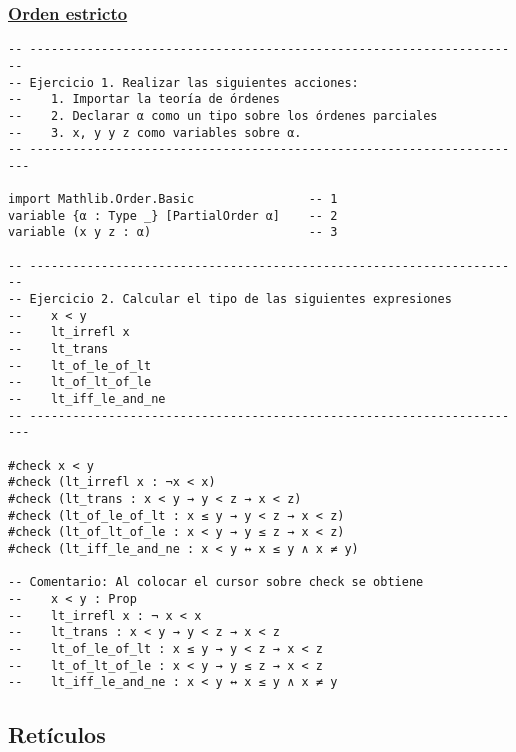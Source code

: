 \subsubsection{\href{./src/Basicos/Orden\_estricto.lean}{Orden estricto}}
\label{sec:orgc5952ca}
\begin{verbatim}
-- ---------------------------------------------------------------------
-- Ejercicio 1. Realizar las siguientes acciones:
--    1. Importar la teoría de órdenes
--    2. Declarar α como un tipo sobre los órdenes parciales
--    3. x, y y z como variables sobre α.
-- ----------------------------------------------------------------------

import Mathlib.Order.Basic                -- 1
variable {α : Type _} [PartialOrder α]    -- 2
variable (x y z : α)                      -- 3

-- ---------------------------------------------------------------------
-- Ejercicio 2. Calcular el tipo de las siguientes expresiones
--    x < y
--    lt_irrefl x
--    lt_trans
--    lt_of_le_of_lt
--    lt_of_lt_of_le
--    lt_iff_le_and_ne
-- ----------------------------------------------------------------------

#check x < y
#check (lt_irrefl x : ¬x < x)
#check (lt_trans : x < y → y < z → x < z)
#check (lt_of_le_of_lt : x ≤ y → y < z → x < z)
#check (lt_of_lt_of_le : x < y → y ≤ z → x < z)
#check (lt_iff_le_and_ne : x < y ↔ x ≤ y ∧ x ≠ y)

-- Comentario: Al colocar el cursor sobre check se obtiene
--    x < y : Prop
--    lt_irrefl x : ¬ x < x
--    lt_trans : x < y → y < z → x < z
--    lt_of_le_of_lt : x ≤ y → y < z → x < z
--    lt_of_lt_of_le : x < y → y ≤ z → x < z
--    lt_iff_le_and_ne : x < y ↔ x ≤ y ∧ x ≠ y
\end{verbatim}

\subsection{Retículos}
\label{sec:orgd7937b6}

